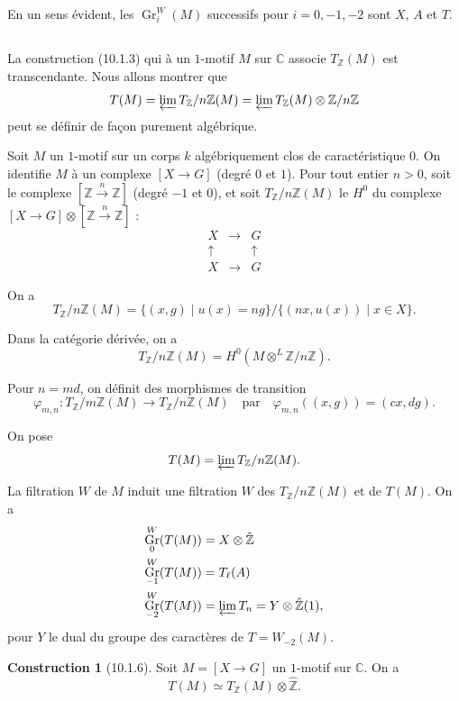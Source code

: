 \documentclass[12pt,a4paper]{amsart}
\theoremstyle{plain}
\theoremstyle{definition}
\newtheorem{construction}[lemme]{Construction}
\theoremstyle{remark}
\DeclareMathOperator{\Gr}{Gr}
\numberwithin{equation}{section}
\begin{document}
En un sens évident, les $\Gr_i^W(M)$ successifs pour $i=0,-1,-2$ sont $X$, $A$ et $T$.

\subsection{}\label{10.1.5}
La construction (10.1.3) qui à un $1$-motif $M$ sur $\mathbb{C}$ associe $T_\mathbb{Z}(M)$ est transcendante. Nous allons montrer que
\[
T(M) = \varprojlim T_\mathbb{Z}/n\mathbb{Z}(M) = \varprojlim T_\mathbb{Z}(M)\otimes\mathbb{Z}/n\mathbb{Z}
\]
peut se définir de façon purement algébrique.

Soit $M$ un $1$-motif sur un corps $k$ algébriquement clos de caractéristique $0$. On identifie $M$ à un complexe $[X\to G]$ (degré $0$ et $1$). Pour tout entier $n>0$, soit le complexe $[\mathbb{Z}\xrightarrow{n}\mathbb{Z}]$ (degré $-1$ et $0$), et soit $T_\mathbb{Z}/n\mathbb{Z}(M)$ le $H^0$ du complexe $[X\to G]\otimes[\mathbb{Z}\xrightarrow{n}\mathbb{Z}]$ :
\[
\begin{array}{ccc}
X & \longrightarrow & G \\
\uparrow & & \uparrow \\
X & \longrightarrow & G
\end{array}
\]

On a
\[
T_\mathbb{Z}/n\mathbb{Z}(M) = \{(x,g)\mid u(x)=ng\}/\{(nx,u(x))\mid x\in X\}.
\]

Dans la catégorie dérivée, on a
\[
T_\mathbb{Z}/n\mathbb{Z}(M) = H^0(M\otimes^L\mathbb{Z}/n\mathbb{Z}).
\]

Pour $n=md$, on définit des morphismes de transition
\[
\varphi_{m,n}:T_\mathbb{Z}/m\mathbb{Z}(M)\to T_\mathbb{Z}/n\mathbb{Z}(M) \quad\text{par}\quad \varphi_{m,n}((x,g)) = (cx,dg).
\]

On pose
\[
T(M) = \varprojlim T_\mathbb{Z}/n\mathbb{Z}(M).
\]

La filtration $W$ de $M$ induit une filtration $W$ des $T_\mathbb{Z}/n\mathbb{Z}(M)$ et de $T(M)$. On a
\begin{align*}
\Gr_0^W(T(M)) &= X\otimes\hat{\mathbb{Z}} \\
\Gr_{-1}^W(T(M)) &= T_\ell(A) \\
\Gr_{-2}^W(T(M)) &= \varprojlim T_n = Y\otimes\hat{\mathbb{Z}}(1),
\end{align*}
pour $Y$ le dual du groupe des caractères de $T=W_{-2}(M)$.

\begin{construction}[10.1.6]\label{cons:10.1.6}
Soit $M=[X\to G]$ un $1$-motif sur $\mathbb{C}$. On a
\begin{equation}\label{eq:10.1.6.1}
T(M) \simeq T_\mathbb{Z}(M)\otimes\hat{\mathbb{Z}}.
\end{equation}
\end{construction}
\end{document}
